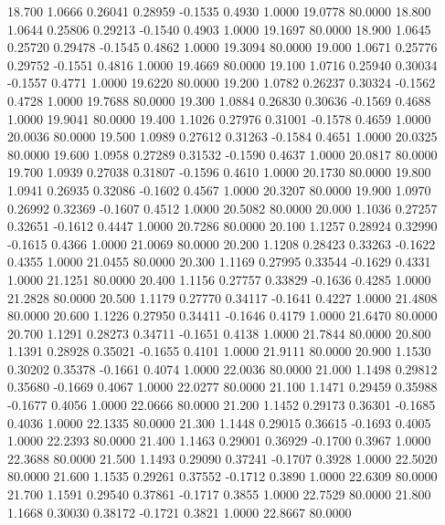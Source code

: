   18.700   1.0666   0.26041   0.28959  -0.1535   0.4930   1.0000  19.0778  80.0000
  18.800   1.0644   0.25806   0.29213  -0.1540   0.4903   1.0000  19.1697  80.0000
  18.900   1.0645   0.25720   0.29478  -0.1545   0.4862   1.0000  19.3094  80.0000
  19.000   1.0671   0.25776   0.29752  -0.1551   0.4816   1.0000  19.4669  80.0000
  19.100   1.0716   0.25940   0.30034  -0.1557   0.4771   1.0000  19.6220  80.0000
  19.200   1.0782   0.26237   0.30324  -0.1562   0.4728   1.0000  19.7688  80.0000
  19.300   1.0884   0.26830   0.30636  -0.1569   0.4688   1.0000  19.9041  80.0000
  19.400   1.1026   0.27976   0.31001  -0.1578   0.4659   1.0000  20.0036  80.0000
  19.500   1.0989   0.27612   0.31263  -0.1584   0.4651   1.0000  20.0325  80.0000
  19.600   1.0958   0.27289   0.31532  -0.1590   0.4637   1.0000  20.0817  80.0000
  19.700   1.0939   0.27038   0.31807  -0.1596   0.4610   1.0000  20.1730  80.0000
  19.800   1.0941   0.26935   0.32086  -0.1602   0.4567   1.0000  20.3207  80.0000
  19.900   1.0970   0.26992   0.32369  -0.1607   0.4512   1.0000  20.5082  80.0000
  20.000   1.1036   0.27257   0.32651  -0.1612   0.4447   1.0000  20.7286  80.0000
  20.100   1.1257   0.28924   0.32990  -0.1615   0.4366   1.0000  21.0069  80.0000
  20.200   1.1208   0.28423   0.33263  -0.1622   0.4355   1.0000  21.0455  80.0000
  20.300   1.1169   0.27995   0.33544  -0.1629   0.4331   1.0000  21.1251  80.0000
  20.400   1.1156   0.27757   0.33829  -0.1636   0.4285   1.0000  21.2828  80.0000
  20.500   1.1179   0.27770   0.34117  -0.1641   0.4227   1.0000  21.4808  80.0000
  20.600   1.1226   0.27950   0.34411  -0.1646   0.4179   1.0000  21.6470  80.0000
  20.700   1.1291   0.28273   0.34711  -0.1651   0.4138   1.0000  21.7844  80.0000
  20.800   1.1391   0.28928   0.35021  -0.1655   0.4101   1.0000  21.9111  80.0000
  20.900   1.1530   0.30202   0.35378  -0.1661   0.4074   1.0000  22.0036  80.0000
  21.000   1.1498   0.29812   0.35680  -0.1669   0.4067   1.0000  22.0277  80.0000
  21.100   1.1471   0.29459   0.35988  -0.1677   0.4056   1.0000  22.0666  80.0000
  21.200   1.1452   0.29173   0.36301  -0.1685   0.4036   1.0000  22.1335  80.0000
  21.300   1.1448   0.29015   0.36615  -0.1693   0.4005   1.0000  22.2393  80.0000
  21.400   1.1463   0.29001   0.36929  -0.1700   0.3967   1.0000  22.3688  80.0000
  21.500   1.1493   0.29090   0.37241  -0.1707   0.3928   1.0000  22.5020  80.0000
  21.600   1.1535   0.29261   0.37552  -0.1712   0.3890   1.0000  22.6309  80.0000
  21.700   1.1591   0.29540   0.37861  -0.1717   0.3855   1.0000  22.7529  80.0000
  21.800   1.1668   0.30030   0.38172  -0.1721   0.3821   1.0000  22.8667  80.0000

